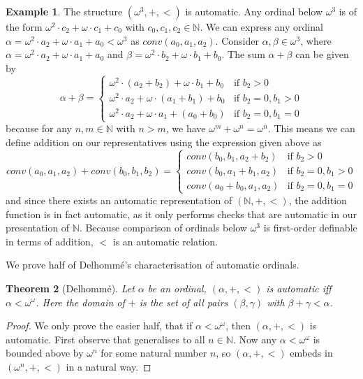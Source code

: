 \documentclass[british,a4paper,]{scrartcl}
\newtheorem{theorem}{Theorem}
\theoremstyle{definition}
\newtheorem{example}[theorem]{Example}
\theoremstyle{remark}
\newcommand{\N}{\mathbb{N}}
\begin{document}
\begin{example} \label{ex:omegacubeautomatic}
    The structure \((\omega^3, +, <)\) is automatic. Any ordinal below \(\omega^3\) is of the form
    \(\omega^2\cdot c_2 + \omega\cdot c_1 + c_0\) with \(c_0,c_1,c_2 \in \N\).
    We can express any ordinal \(\alpha = \omega^2\cdot a_2 + \omega\cdot a_1 + a_0 < \omega^3\) as \(conv(a_0, a_1, a_2)\).
    Consider \(\alpha,\beta \in \omega^3\), where
    \(\alpha = \omega^2\cdot a_2 + \omega\cdot a_1 + a_0\) and
    \(\beta = \omega^2\cdot b_2 + \omega\cdot b_1 + b_0\).
    The sum \(\alpha + \beta\) can be given by
    \[
        \alpha + \beta = \begin{cases}
            \omega^2\cdot(a_2 + b_2) + \omega\cdot b_1 + b_0 &\text{if } b_2>0\\
            \omega^2\cdot a_2 + \omega\cdot(a_1 + b_1) + b_0 &\text{if } b_2=0, b_1>0\\
            \omega^2\cdot a_2 + \omega\cdot a_1 + (a_0 + b_0) &\text{if } b_2=0, b_1=0
        \end{cases}
    \]
    because for any \(n,m\in\N\) with \(n>m\), we have \(\omega^m + \omega^n = \omega^{n}\).
    This means we can define addition on our representatives using the expression given above as
    \[
        conv(a_0,a_1,a_2) + conv(b_0,b_1,b_2) = \begin{cases}
            conv(b_0, b_1, a_2 + b_2)
            &\text{if } b_2>0\\
            conv(b_0, a_1+b_1, a_2)
            &\text{if } b_2=0, b_1>0\\
            conv(a_0+b_0, a_1, a_2)
            &\text{if } b_2=0, b_1=0
        \end{cases}
    \]
    and since there exists an automatic representation of \((\N, +, <)\),
    the addition function is in fact automatic,
    as it only performs checks that are automatic in our presentation of \(\N\).
    Because comparison of ordinals below \(\omega^3\) is first-order definable in terms of addition, \(<\) is an automatic relation.
\end{example}

We prove half of Delhomm\'e's characterisation of automatic ordinals.
\autocite{delhomme}
\begin{theorem}[Delhomm\'e] \label{thm:delhomme}
    Let \(\alpha\) be an ordinal, \((\alpha, +, <)\) is automatic iff \(\alpha < \omega^\omega\).
    Here the domain of \(+\) is the set of all pairs \((\beta,\gamma)\) with \(\beta + \gamma < \alpha\).
\end{theorem}
\begin{proof}
    We only prove the easier half, that if \(\alpha < \omega^\omega\), then \((\alpha, +, <)\) is automatic.
    First observe that  generalises to all \(n\in \N\).
    Now any \(\alpha < \omega^\omega\) is bounded above by \(\omega^n\) for some natural number \(n\), so \((\alpha, +, <)\) embeds in \((\omega^n, +, <)\) in a natural way.
\end{proof}
\end{document}
